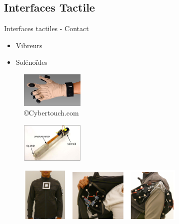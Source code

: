 \documentclass[compress, noflama]{beamer}
\begin{document}
\subsection{Interfaces Tactile}
\begin{frame}{Interfaces tactiles - Contact}
\begin{itemize}
\item Vibreurs
\item Solénoïdes
\end{itemize}

\begin{multicols}{2}
\begin{figure}
\centering
\includegraphics[width=3cm]{images/cybertouch}
\caption{\copyright Cybertouch.com}
\end{figure}
\begin{figure}
\centering
\includegraphics[width=3cm]{images/hapticPen}
\vspace{-0.2cm}
\caption{\cite{Lee2004}}
\end{figure}
\end{multicols}

\vspace{-1cm}

\begin{figure}
\centering
\includegraphics[width=8cm]{images/Rahman2010}
\caption{\cite{Rahman2010}}
\end{figure}

\end{frame}
\end{document}
